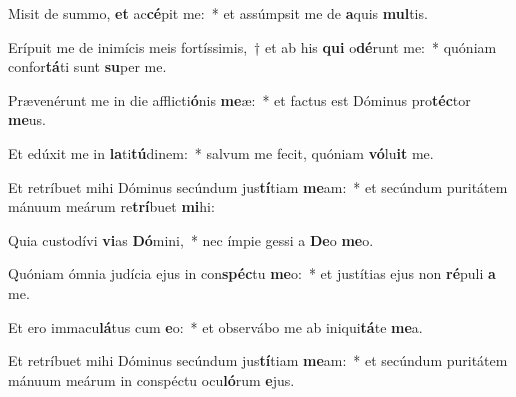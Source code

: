\item Misit de summo, \textbf{et} ac\textbf{cé}pit me:~* et assúmpsit me de \textbf{a}quis \textbf{mul}tis.
\item Erípuit me de inimícis meis fortíssimis,~† et ab his \textbf{qui} o\textbf{dé}runt me:~* quóniam confor\textbf{tá}ti sunt \textbf{su}per me.
\item Prævenérunt me in die afflicti\textbf{ó}nis \textbf{me}æ:~* et factus est Dóminus pro\textbf{téc}tor \textbf{me}us.
\item Et edúxit me in \textbf{la}ti\textbf{tú}dinem:~* salvum me fecit, quóniam \textbf{vó}lu\textbf{it} me.
\item Et retríbuet mihi Dóminus secúndum jus\textbf{tí}tiam \textbf{me}am:~* et secúndum puritátem mánuum meárum re\textbf{trí}buet \textbf{mi}hi:
\item Quia custodívi \textbf{vi}as \textbf{Dó}mini,~* nec ímpie gessi a \textbf{De}o \textbf{me}o.
\item Quóniam ómnia judícia ejus in con\textbf{spéc}tu \textbf{me}o:~* et justítias ejus non \textbf{ré}puli \textbf{a} me.
\item Et ero immacu\textbf{lá}tus cum \textbf{e}o:~* et observábo me ab iniqui\textbf{tá}te \textbf{me}a.
\item Et retríbuet mihi Dóminus secúndum jus\textbf{tí}tiam \textbf{me}am:~* et secúndum puritátem mánuum meárum in conspéctu ocu\textbf{ló}rum \textbf{e}jus.
